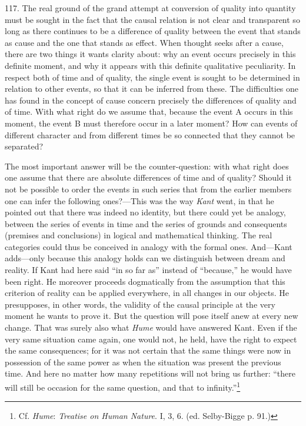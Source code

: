 \documentclass[12pt,a4paper]{book}
\newcommand{\opage}[1]{\marginnote{\footnotesize\textit{[#1]}}}
\begin{document}
117. The real ground of the grand attempt at conversion of quality into
quantity must be sought in the fact that the causal relation is not clear and
transparent so long as there continues to be a difference of quality between
the event that stands as cause and the one that stands as effect. When thought
seeks after a cause, there are two things it wants clarity about: why an event
occurs precisely in this definite moment, and why it appears with this definite
qualitative peculiarity. In respect both of time and of quality, the single
event is sought to be determined in relation to other events, so that it can be
inferred from these. The difficulties one has found in the concept of cause
concern precisely the differences of quality and of time. With what right do we
assume that, because the event A occurs in this moment, the event B must
therefore occur in a later moment? How can events of different character and
from different times be so connected that they cannot be separated?

The most important answer will be the counter-question: with what right does
one assume that there are absolute differences of time and of quality? Should
it not be possible to order the events in such series that from the earlier
members one can infer the following ones?---This was the way \emph{Kant} went,
in that he pointed out that there was indeed no identity, but there could yet be
analogy, between the series of events in \opage{279}time and the series of grounds and
consequents (premises and conclusions) in logical and mathematical thinking.
The real categories could thus be conceived in analogy with the formal ones.
And---Kant adds---only because this analogy holds can we distinguish between
dream and reality. If Kant had here said ``in so far as'' instead of
``because,'' he would have been right. He moreover proceeds dogmatically from
the assumption that this criterion of reality can be applied everywhere, in all
changes in our objects. He presupposes, in other words, the validity of the
causal principle at the very moment he wants to prove it. But the question will
pose itself anew at every new change. That was surely also what \emph{Hume}
would have answered Kant. Even if the very same situation came again, one would
not, he held, have the right to expect the same consequences; for it was not
certain that the same things were now in possession of the same power as when
the situation was present the previous time. And here no matter how many
repetitions will not bring us further: ``there will still be occasion for the
same question, and that to infinity.''\footnote{Cf. \emph{Hume}: \emph{Treatise
on Human Nature}. I, 3, 6. (ed. Selby-Bigge p. 91.)}
\end{document}
